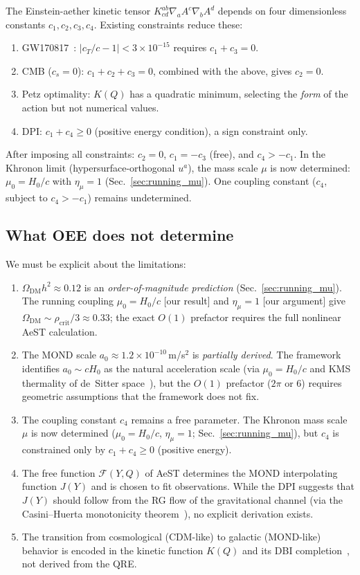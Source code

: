 \documentclass[prd,twocolumn,superscriptaddress,longbibliography,floatfix]{revtex4-2}
\newcommand{\OmDM}{\Omega_{\mathrm{DM}}}
\begin{document}
The Einstein-aether kinetic tensor
$K^{ab}_{cd}\nabla_a A^c \nabla_b A^d$ depends on four
dimensionless constants $c_1, c_2, c_3, c_4$.
Existing constraints reduce these:
\begin{enumerate}
\item GW170817~\cite{GW170817}: $|c_T/c - 1| < 3 \times
  10^{-15}$ requires $c_1 + c_3 = 0$.
\item CMB ($c_s = 0$): $c_1 + c_2 + c_3 = 0$, combined
  with the above, gives $c_2 = 0$.
\item Petz optimality: $K(Q)$ has a quadratic minimum,
  selecting the \emph{form} of the action but not
  numerical values.
\item DPI: $c_1 + c_4 \geq 0$ (positive energy
  condition), a sign constraint only.
\end{enumerate}
After imposing all constraints:
$c_2 = 0$, $c_1 = -c_3$ (free), and $c_4 > -c_1$.
In the Khronon limit (hypersurface-orthogonal $u^a$),
the mass scale $\mu$ is now determined:
$\mu_0 = H_0/c$ with $\eta_\mu = 1$
(Sec.~\ref{sec:running_mu}).  One coupling constant
($c_4$, subject to $c_4 > -c_1$) remains
undetermined.

\subsection{What OEE does not determine}
\label{sec:OEE_limitations}

We must be explicit about the limitations:
\begin{enumerate}
\item $\OmDM h^2 \approx 0.12$ is an
  \emph{order-of-magnitude prediction}
  (Sec.~\ref{sec:running_mu}).  The running coupling
  $\mu_0 = H_0/c$ [our result] and $\eta_\mu = 1$
  [our argument] give
  $\OmDM \sim \rho_{\mathrm{crit}}/3 \approx 0.33$;
  the exact $O(1)$ prefactor requires the full
  nonlinear AeST calculation.
\item The MOND scale $a_0 \approx 1.2 \times 10^{-10}$\,m/s$^2$
  is \emph{partially derived}.  The framework identifies
  $a_0 \sim cH_0$ as the natural acceleration scale
  (via $\mu_0 = H_0/c$ and KMS thermality of de~Sitter
  space~\cite{Milgrom2020,Verlinde2016}), but the
  $O(1)$ prefactor ($2\pi$ or 6) requires geometric
  assumptions that the framework does not fix.
\item The coupling constant $c_4$ remains a free parameter.
  The Khronon mass scale $\mu$ is now determined
  ($\mu_0 = H_0/c$, $\eta_\mu = 1$;
  Sec.~\ref{sec:running_mu}), but $c_4$ is constrained
  only by $c_1 + c_4 \geq 0$ (positive energy).
\item The free function $\mathcal{F}(Y,Q)$ of AeST
  determines the MOND interpolating function $J(Y)$
  and is chosen to fit observations.  While the DPI
  suggests that $J(Y)$ should follow from the RG
  flow of the gravitational channel (via the
  Casini--Huerta monotonicity
  theorem~\cite{CasiniHuerta2017}), no explicit
  derivation exists.
\item The transition from cosmological (CDM-like) to
  galactic (MOND-like) behavior is encoded in the
  kinetic function $K(Q)$ and its DBI
  completion~\cite{BlanchetSkordis2024}, not derived
  from the QRE.
\end{enumerate}
\end{document}
